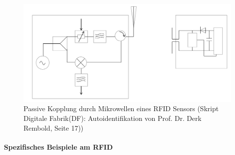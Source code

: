 \documentclass[a4paper,12pt]{scrartcl}
\begin{document}
\begin{figure}[H]
\centering
\includegraphics[scale=0.28]{picture/mikrowellen}
\caption{Passive Kopplung durch Mikrowellen eines RFID Sensors (Skript Digitale Fabrik(DF): Autoidentifikation von Prof. Dr. Derk Rembold, Seite 17))}
\label{fig:Passive Kopplung durch Mikrowellen eines RFID Sensors}
\end{figure}

\paragraph{Spezifisches Beispiele am RFID
\cite{IndustrieundHandelskammerReutlingen.}}
\end{document}
